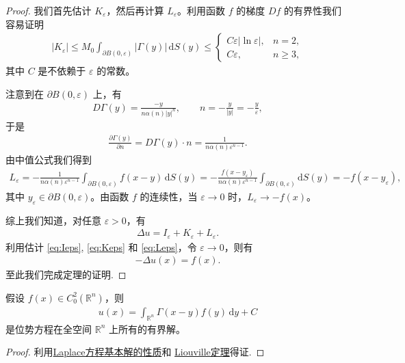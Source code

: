 \documentclass[../../main.tex]{subfiles}%
\begin{document}
\begin{proof}
我们首先估计 $K_\varepsilon$，然后再计算 $L_\varepsilon$。利用函数 $f$ 的梯度 $Df$ 的有界性我们容易证明
\begin{align}
|K_\varepsilon| \leqslant M_0 \int_{\partial B(0,\varepsilon)} |\varGamma (y)|\,\mathrm{d}S(y)
\leqslant \begin{cases}
C\varepsilon|\ln\varepsilon|, & n=2, \\
C\varepsilon, & n\geqslant 3,
\end{cases} \label{eq:Keps}
\end{align}
其中 $C$ 是不依赖于 $\varepsilon$ 的常数。

注意到在 $\partial B(0,\varepsilon)$ 上，有
\begin{align*}
D\varGamma (y) = \frac{-y}{n\alpha(n)|y|^n}, \qquad n = -\frac{y}{|y|} = -\frac{y}{\varepsilon},
\end{align*}
于是
\begin{align*}
\frac{\partial\varGamma (y)}{\partial n} = D\varGamma (y)\cdot n = \frac{1}{n\alpha(n)\varepsilon^{n-1}}.
\end{align*}
由中值公式我们得到
\begin{align}
L_\varepsilon = -\frac{1}{n\alpha(n)\varepsilon^{n-1}} \int_{\partial B(0,\varepsilon)} f(x-y)\,\mathrm{d}S(y)
= -\frac{f(x-y_\varepsilon)}{n\alpha(n)\varepsilon^{n-1}} \int_{\partial B(0,\varepsilon)} \mathrm{d}S(y) = -f(x-y_\varepsilon), \label{eq:Leps}
\end{align}
其中 $y_\varepsilon\in\partial B(0,\varepsilon)$。由函数 $f$ 的连续性，当 $\varepsilon\to 0$ 时，$L_\varepsilon\to -f(x)$。

综上我们知道，对任意 $\varepsilon>0$，有
\begin{align*}
\Delta u = I_\varepsilon + K_\varepsilon + L_\varepsilon.
\end{align*}
利用估计 \eqref{eq:Ieps}, \eqref{eq:Keps} 和 \eqref{eq:Leps}，令 $\varepsilon\to 0$，则有
\begin{align*}
-\Delta u(x) = f(x).
\end{align*}
至此我们完成定理的证明.
\end{proof}

\begin{theorem}
假设 $f(x)\in C_0^2(\mathbb{R}^n)$，则
\begin{align*}
u(x) = \int_{\mathbb{R}^n} \varGamma (x-y)f(y)\,\mathrm{d}y + C
\end{align*}
是位势方程在全空间 $\mathbb{R}^n$ 上所有的有界解。
\end{theorem}
\begin{proof}
利用\hyperref[theorem:Laplace方程基本解的性质]{Laplace方程基本解的性质}和 \hyperref[theorem:PDE-Liouville定理]{Liouville定理}得证.
\end{proof}
\end{document}
